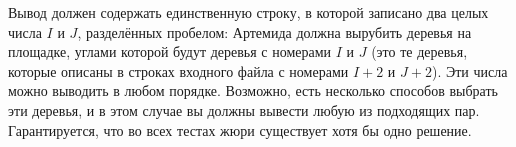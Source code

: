 Вывод должен содержать единственную строку,
в которой записано два целых числа $I$ и $J$, разделённых пробелом:
Артемида должна вырубить деревья на площадке, углами которой будут деревья
с номерами $I$ и $J$ (это те деревья, которые описаны в строках
входного файла с номерами $I + 2$ и $J + 2$).
Эти числа можно выводить в любом порядке.
Возможно, есть несколько способов выбрать эти деревья, и в этом случае
вы должны вывести любую из подходящих пар.
Гарантируется, что во всех тестах жюри существует хотя бы одно решение.


